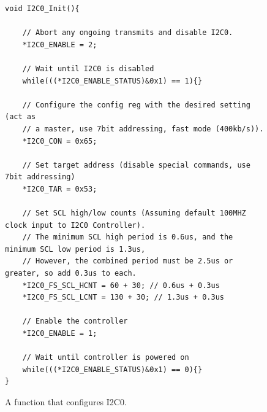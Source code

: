 \documentclass[11pt, twoside, pdftex]{article}
\begin{document}

\begin{figure}[H]
\begin{center}
\begin{minipage}[t]{16 cm}
\begin{lstlisting}
void I2C0_Init(){

    // Abort any ongoing transmits and disable I2C0.
    *I2C0_ENABLE = 2;
    
    // Wait until I2C0 is disabled
    while(((*I2C0_ENABLE_STATUS)&0x1) == 1){}
    
    // Configure the config reg with the desired setting (act as 
    // a master, use 7bit addressing, fast mode (400kb/s)).
    *I2C0_CON = 0x65;
    
    // Set target address (disable special commands, use 7bit addressing)
    *I2C0_TAR = 0x53;
    
    // Set SCL high/low counts (Assuming default 100MHZ clock input to I2C0 Controller).
    // The minimum SCL high period is 0.6us, and the minimum SCL low period is 1.3us,
    // However, the combined period must be 2.5us or greater, so add 0.3us to each.
    *I2C0_FS_SCL_HCNT = 60 + 30; // 0.6us + 0.3us
    *I2C0_FS_SCL_LCNT = 130 + 30; // 1.3us + 0.3us
    
    // Enable the controller
    *I2C0_ENABLE = 1;
    
    // Wait until controller is powered on
    while(((*I2C0_ENABLE_STATUS)&0x1) == 0){}
}
\end{lstlisting}
\end{minipage}
\end{center}
\vspace{-0.33in}\caption{A function that configures I2C0.}
\label{fig:i2c0_init_code}
\end{figure}
\end{document}
